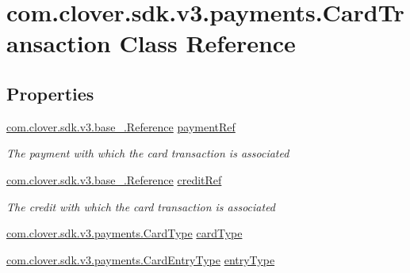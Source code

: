 \hypertarget{classcom_1_1clover_1_1sdk_1_1v3_1_1payments_1_1_card_transaction}{}\section{com.\+clover.\+sdk.\+v3.\+payments.\+Card\+Transaction Class Reference}
\label{classcom_1_1clover_1_1sdk_1_1v3_1_1payments_1_1_card_transaction}
\subsection*{Properties}
\begin{DoxyCompactItemize}
\item 
\hyperlink{classcom_1_1clover_1_1sdk_1_1v3_1_1base___1_1_reference}{com.\+clover.\+sdk.\+v3.\+base\+\_\+.\+Reference} \hyperlink{classcom_1_1clover_1_1sdk_1_1v3_1_1payments_1_1_card_transaction_ab2e18403d61ac56a7225a75a358cb8a1}{payment\+Ref}
\begin{DoxyCompactList}\small\item\em The payment with which the card transaction is associated \end{DoxyCompactList}\item 
\hyperlink{classcom_1_1clover_1_1sdk_1_1v3_1_1base___1_1_reference}{com.\+clover.\+sdk.\+v3.\+base\+\_\+.\+Reference} \hyperlink{classcom_1_1clover_1_1sdk_1_1v3_1_1payments_1_1_card_transaction_a8f4786dd82bad491ae52a4c5cc77ef7d}{credit\+Ref}
\begin{DoxyCompactList}\small\item\em The credit with which the card transaction is associated \end{DoxyCompactList}\item 
\hyperlink{namespacecom_1_1clover_1_1sdk_1_1v3_1_1payments_ae544d2f27295fd15a3abb7d87bc35928}{com.\+clover.\+sdk.\+v3.\+payments.\+Card\+Type} \hyperlink{classcom_1_1clover_1_1sdk_1_1v3_1_1payments_1_1_card_transaction_aab17d3049c613ef762d112a53069289c}{card\+Type}
\item 
\hyperlink{namespacecom_1_1clover_1_1sdk_1_1v3_1_1payments_ac92e851a362529ec3fa138bd64dec615}{com.\+clover.\+sdk.\+v3.\+payments.\+Card\+Entry\+Type} \hyperlink{classcom_1_1clover_1_1sdk_1_1v3_1_1payments_1_1_card_transaction_a15f204658a8a09929355d65427686a00}{entry\+Type}

\end{DoxyCompactItemize}
